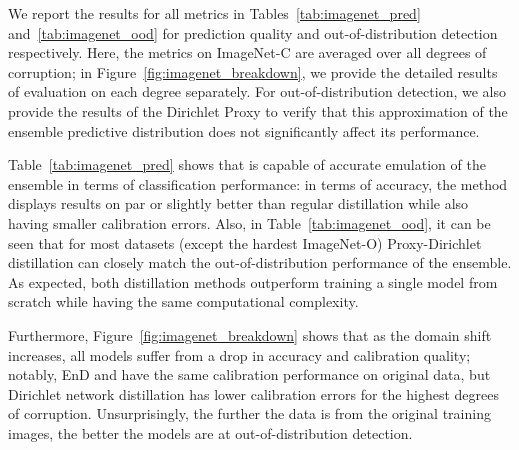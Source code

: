 


We report the results for all metrics in Tables~\ref{tab:imagenet_pred} and~\ref{tab:imagenet_ood} for prediction quality and out-of-distribution detection respectively.
Here, the metrics on ImageNet-C are averaged over all degrees of corruption; in Figure~\ref{fig:imagenet_breakdown}, we provide the detailed results of evaluation on each degree separately.
For out-of-distribution detection, we also provide the results of the Dirichlet Proxy to verify that this approximation of the ensemble predictive distribution does not significantly affect its performance.

Table~\ref{tab:imagenet_pred} shows that \Endd is capable of accurate emulation of the ensemble in terms of classification performance: in terms of accuracy, the method displays results on par or slightly better than regular distillation while also having smaller calibration errors. Also, in Table~\ref{tab:imagenet_ood}, it can be seen that for most datasets (except the hardest ImageNet-O) Proxy-Dirichlet distillation can closely match the out-of-distribution performance of the ensemble. As expected, both distillation methods outperform training a single model from scratch while having the same computational complexity.

Furthermore, Figure~\ref{fig:imagenet_breakdown} shows that as the domain shift increases, all models suffer from a drop in accuracy and calibration quality; notably, EnD and \Endd have the same calibration performance on original data, but Dirichlet network distillation has lower calibration errors for the highest degrees of corruption. Unsurprisingly, the further the data is from the original training images, the better the models are at out-of-distribution detection.


